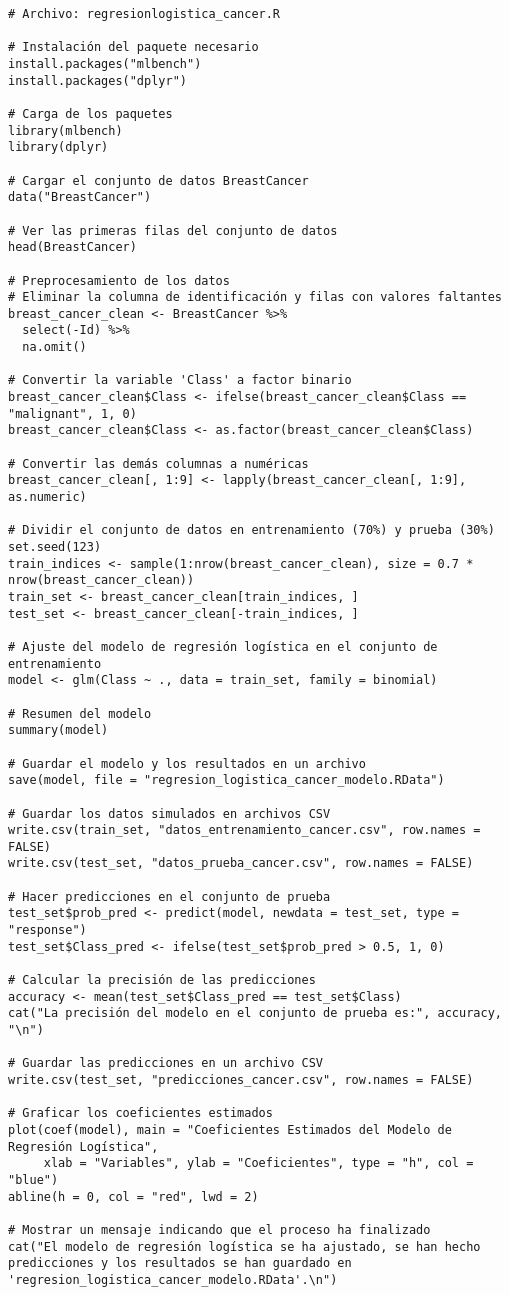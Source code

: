 \begin{verbatim}
# Archivo: regresionlogistica_cancer.R

# Instalación del paquete necesario
install.packages("mlbench")
install.packages("dplyr")

# Carga de los paquetes
library(mlbench)
library(dplyr)

# Cargar el conjunto de datos BreastCancer
data("BreastCancer")

# Ver las primeras filas del conjunto de datos
head(BreastCancer)

# Preprocesamiento de los datos
# Eliminar la columna de identificación y filas con valores faltantes
breast_cancer_clean <- BreastCancer %>%
  select(-Id) %>%
  na.omit()

# Convertir la variable 'Class' a factor binario
breast_cancer_clean$Class <- ifelse(breast_cancer_clean$Class == "malignant", 1, 0)
breast_cancer_clean$Class <- as.factor(breast_cancer_clean$Class)

# Convertir las demás columnas a numéricas
breast_cancer_clean[, 1:9] <- lapply(breast_cancer_clean[, 1:9], as.numeric)

# Dividir el conjunto de datos en entrenamiento (70%) y prueba (30%)
set.seed(123)
train_indices <- sample(1:nrow(breast_cancer_clean), size = 0.7 * nrow(breast_cancer_clean))
train_set <- breast_cancer_clean[train_indices, ]
test_set <- breast_cancer_clean[-train_indices, ]

# Ajuste del modelo de regresión logística en el conjunto de entrenamiento
model <- glm(Class ~ ., data = train_set, family = binomial)

# Resumen del modelo
summary(model)

# Guardar el modelo y los resultados en un archivo
save(model, file = "regresion_logistica_cancer_modelo.RData")

# Guardar los datos simulados en archivos CSV
write.csv(train_set, "datos_entrenamiento_cancer.csv", row.names = FALSE)
write.csv(test_set, "datos_prueba_cancer.csv", row.names = FALSE)

# Hacer predicciones en el conjunto de prueba
test_set$prob_pred <- predict(model, newdata = test_set, type = "response")
test_set$Class_pred <- ifelse(test_set$prob_pred > 0.5, 1, 0)

# Calcular la precisión de las predicciones
accuracy <- mean(test_set$Class_pred == test_set$Class)
cat("La precisión del modelo en el conjunto de prueba es:", accuracy, "\n")

# Guardar las predicciones en un archivo CSV
write.csv(test_set, "predicciones_cancer.csv", row.names = FALSE)

# Graficar los coeficientes estimados
plot(coef(model), main = "Coeficientes Estimados del Modelo de Regresión Logística", 
     xlab = "Variables", ylab = "Coeficientes", type = "h", col = "blue")
abline(h = 0, col = "red", lwd = 2)

# Mostrar un mensaje indicando que el proceso ha finalizado
cat("El modelo de regresión logística se ha ajustado, se han hecho predicciones y los resultados se han guardado en 'regresion_logistica_cancer_modelo.RData'.\n")
\end{verbatim}

